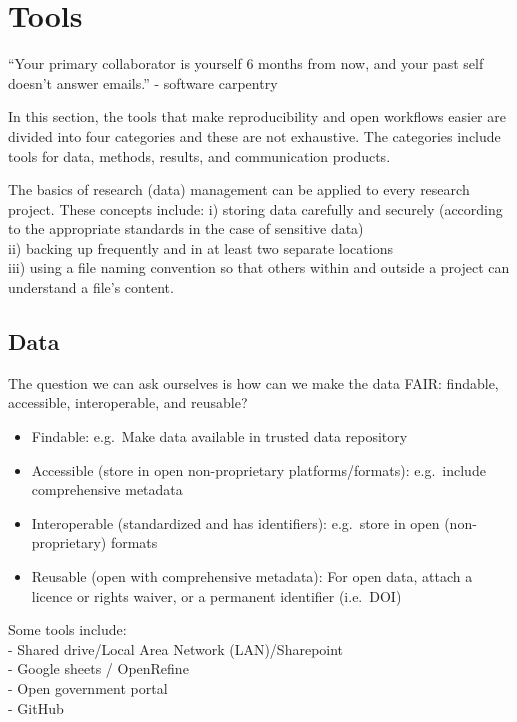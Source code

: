 \documentclass[
]{book}
\providecommand{\tightlist}{%
  \setlength{\itemsep}{0pt}\setlength{\parskip}{0pt}}
\begin{document}
\hypertarget{tools}{%
\section{Tools}\label{tools}}

``Your primary collaborator is yourself 6 months from now, and your past self doesn't answer emails.'' - software carpentry

In this section, the tools that make reproducibility and open workflows easier are divided into four categories and these are not exhaustive. The categories include tools for data, methods, results, and communication products.

The basics of research (data) management can be applied to every research project. These concepts include:
i) storing data carefully and securely (according to the appropriate standards in the case of sensitive data)\\
ii) backing up frequently and in at least two separate locations\\
iii) using a file naming convention so that others within and outside a project can understand a file's content.

\hypertarget{data}{%
\subsection{Data}\label{data}}

The question we can ask ourselves is how can we make the data FAIR: findable, accessible, interoperable, and reusable?

\begin{itemize}
\tightlist
\item
  Findable: e.g.~Make data available in trusted data repository\\
\item
  Accessible (store in open non-proprietary platforms/formats): e.g.~include comprehensive metadata
\item
  Interoperable (standardized and has identifiers): e.g.~store in open (non-proprietary) formats
\item
  Reusable (open with comprehensive metadata): For open data, attach a licence or rights waiver, or a permanent identifier (i.e.~DOI)
\end{itemize}

Some tools include:\\
- Shared drive/Local Area Network (LAN)/Sharepoint\\
- Google sheets / OpenRefine\\
- Open government portal\\
- GitHub
\end{document}
